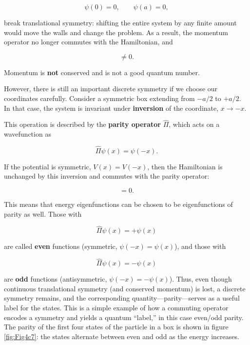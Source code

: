 \documentclass[
  english,
  9pt,
]{extbook}
\theoremstyle{definition}
\theoremstyle{definition}
\theoremstyle{definition}
\theoremstyle{definition}
\theoremstyle{remark}
\begin{document}
\begin{equation}
\psi(0) = 0, \qquad \psi(a) = 0,
\label{eq:spop7} 
\end{equation}

break translational symmetry: shifting the entire system by any finite amount would move the walls and change the problem. As a result, the momentum operator no longer commutes with the Hamiltonian, and

\begin{equation}
[\hat{H}, \hat{p}] \neq 0.
\label{eq:spop8} 
\end{equation}

Momentum is \textbf{not} conserved and is not a good quantum number.

However, there is still an important discrete symmetry if we choose our coordinates carefully. Consider a symmetric box extending from \(-a/2\) to \(+a/2\). In that case, the system is invariant under \textbf{inversion} of the coordinate, \(x \longrightarrow -x.\)

This operation is described by the \textbf{parity operator} \(\hat{\Pi}\), which acts on a wavefunction as

\begin{equation}
\hat{\Pi}\psi(x) = \psi(-x).
\label{eq:spop10} 
\end{equation}

If the potential is symmetric, \(V(x) = V(-x)\), then the Hamiltonian is unchanged by this inversion and commutes with the parity operator:

\begin{equation}
[\hat{H}, \hat{\Pi}] = 0.
\label{eq:spop11} 
\end{equation}

This means that energy eigenfunctions can be chosen to be eigenfunctions of parity as well. Those with

\begin{equation}
\hat{\Pi}\psi(x) = +\psi(x)
\label{eq:spop12} 
\end{equation}

are called \textbf{even} functions (symmetric, \(\psi(-x) = \psi(x)\)), and those with

\begin{equation}
\hat{\Pi}\psi(x) = -\psi(x)
\label{eq:spop13} 
\end{equation}

are \textbf{odd} functions (antisymmetric, \(\psi(-x) = -\psi(x)\)). Thus, even though continuous translational symmetry (and conserved momentum) is lost, a discrete symmetry remains, and the corresponding quantity---parity---serves as a useful label for the states. This is a simple example of how a commuting operator encodes a symmetry and yields a quantum ``label,'' in this case even/odd parity. The parity of the first four states of the particle in a box is shown in figure \ref{fig:Fig4c7}: the states alternate between even and odd as the energy increases.
\end{document}
